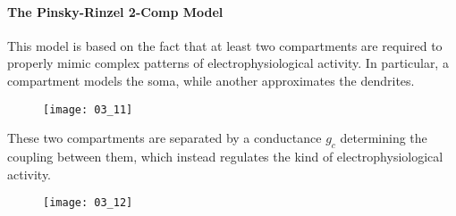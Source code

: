 \paragraph{The Pinsky-Rinzel 2-Comp Model}
This model is based on the fact that at least two compartments are required to properly mimic
complex patterns of electrophysiological activity. In particular, a compartment models the soma,
while another approximates the dendrites.
\begin{figure}[H]
    \texttt{[image: 03\_11]}
    \centering
\end{figure}
These two compartments are separated by a conductance \(g_{c}\) determining the coupling between
them, which instead regulates the kind of electrophysiological activity.
\begin{figure}[H]
    \texttt{[image: 03\_12]}
    \centering
\end{figure}

